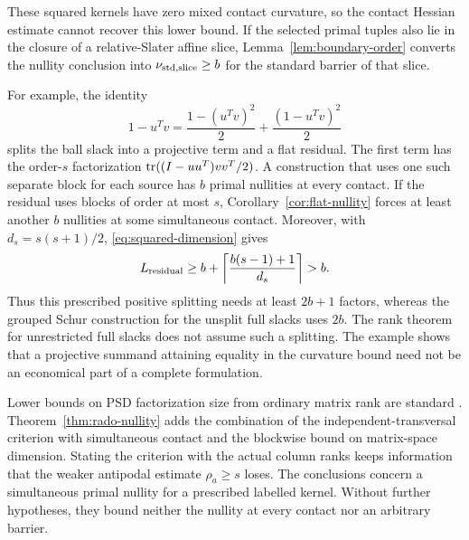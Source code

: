 These squared kernels have zero mixed contact curvature, so the contact
Hessian estimate cannot recover this lower bound. If the
selected primal tuples also lie in the closure of a relative-Slater
affine slice, Lemma~\ref{lem:boundary-order} converts the nullity
conclusion into $\nu_{\mathrm{std},\mathrm{slice}}\geq b$ for the standard barrier of that slice.

For example, the identity
\[
 1-u^Tv=\frac{1-(u^Tv)^2}{2}+\frac{(1-u^Tv)^2}{2}
\]
splits the ball slack into a projective term and a flat residual. The first term has the
order-$s$ factorization $\operatorname{tr}((I-uu^T)vv^T/2)$. A construction that uses
one such separate block for each source has $b$ primal nullities at every
contact. If the residual uses blocks of order at most $s$,
Corollary~\ref{cor:flat-nullity} forces at least another $b$ nullities at
some simultaneous contact. Moreover, with
$d_s=s(s+1)/2$, \eqref{eq:squared-dimension} gives
\[
 L_{\rm residual}\geq b+
       \left\lceil\frac{b(s-1)+1}{d_s}\right\rceil>b.
\]
Thus this prescribed positive splitting needs at least $2b+1$ factors,
whereas the grouped Schur construction for the unsplit full slacks uses
$2b$. The rank theorem for unrestricted full slacks does not assume such a
splitting. The example shows that a projective summand attaining
equality in the curvature bound need not be an economical part of a
complete formulation.

Lower bounds on PSD factorization size from ordinary matrix rank are
standard \citep{FGPRT2015}. Theorem~\ref{thm:rado-nullity} adds the
combination of the independent-transversal criterion with simultaneous
contact and the blockwise bound on matrix-space dimension. Stating the
criterion with the actual column ranks keeps information that the weaker
antipodal estimate $\rho_a\geq s$ loses. The conclusions concern a
simultaneous primal nullity for a prescribed labelled kernel. Without
further hypotheses, they bound neither the nullity at every contact nor
an arbitrary barrier.
